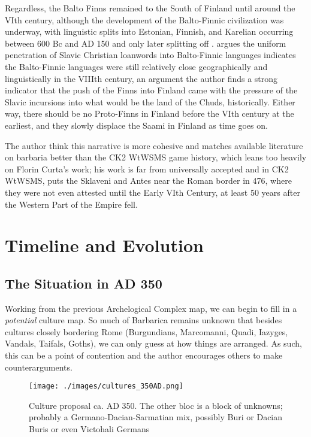 \documentclass{article}
\begin{document}
	Regardless, the Balto Finns remained to the South of Finland until around the VIth century, although the development of the Balto-Finnic civilization was underway, with linguistic splits into Estonian, Finnish, and Karelian occurring between 600 Bc and AD 150 and only later splitting off \cite{LaplandSaami,DiversificationOfProtoFinnic}.
	\cite{DiversificationOfProtoFinnic} argues the uniform penetration of Slavic Christian loanwords into Balto-Finnic languages indicates the Balto-Finnic languages were still relatively close geographically and linguistically in the VIIIth century, an argument the author finds a strong indicator that the push of the Finns into Finland came with the pressure of the Slavic incursions into what would be the land of the Chuds, historically.
	Either way, there should be no Proto-Finns in Finland before the VIth century at the earliest, and they slowly displace the Saami in Finland as time goes on.
	
	The author think this narrative is more cohesive and matches available literature on barbaria better than the CK2 WtWSMS game history, which leans too heavily on Florin Curta’s work; his work is far from universally accepted and in CK2 WtWSMS, puts the Sklaveni and Antes near the Roman border in 476, where they were not even attested until the Early VIth Century, at least 50 years after the Western Part of the Empire fell. 
	
	\section{Timeline and Evolution}
	\label{sec:timeline}
	
	\subsection{The Situation in AD 350}
	\label{sec:timeline:subsec:350}
	
	Working from the previous Archelogical Complex map, we can begin to fill in a \textit{potential} culture map.
	So much of Barbarica remains unknown that besides cultures closely bordering Rome (Burgundians, Marcomanni, Quadi, Iazyges, Vandals, Taifals, Goths), we can only guess at how things are arranged.
	As such, this can be a point of contention and the author encourages others to make counterarguments.
	
	\begin{figure}[h!]
		\centering
		\texttt{[image: ./images/cultures\_350AD.png]}
		\caption{Culture proposal ca. AD 350.
			\newline\tiny The other bloc is a block of unknowns; probably a Germano-Dacian-Sarmatian mix, possibly Buri or Dacian Buris or even Victohali Germans}
	\end{figure}
	
\end{document}
